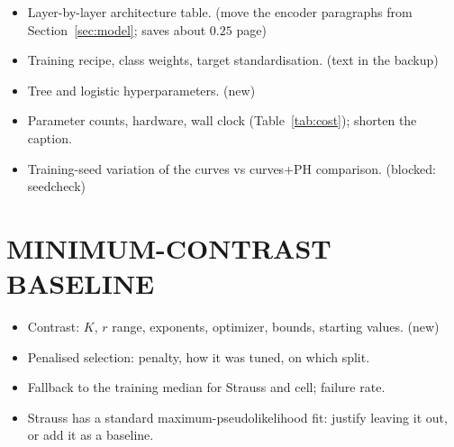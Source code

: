 \documentclass[twoside]{article}
\newcommand{\new}[1]{\textcolor{green!45!black}{#1}}   %
\begin{document}
\begin{itemize}
  \item Layer-by-layer architecture table. (move the encoder paragraphs from Section~\ref{sec:model}; saves about $0.25$ page)
  \item Training recipe, class weights, target standardisation. (text in the backup)
  \item Tree and logistic hyperparameters. (new)
  \item Parameter counts, hardware, wall clock (Table~\ref{tab:cost}); shorten the caption.
  \item Training-seed variation of the curves vs curves+PH comparison. (blocked: seedcheck)
\end{itemize}

\begin{table}[h]
\caption{Each model's input representation and training cost. ``Classifier'' is wall-clock seconds to train the one
$8$-way classifier until early stopping; ``Estimators'' is the same summed over the seven per-family estimators.
``Input'' names the tensors the model sees: \emph{curves} is the $(4,512)$ summary-function stack, \emph{classical}
the same curves as a feature table for the tree learners, and each filtration name a persistence summary of that
filtration's diagrams. \new{All four network rows} share one trainer and stopping rule, so their differences are the
cost of the persistence images alone. Lower is cheaper; cost is not the point of the comparison.}
\label{tab:cost}
\begin{center}
\footnotesize

\end{center}
\end{table}

\section{MINIMUM-CONTRAST BASELINE}
\label{app:mincontrast}

\begin{itemize}
  \item Contrast: $K$, $r$ range, exponents, optimizer, bounds, starting values. (new)
  \item Penalised selection: penalty, how it was tuned, on which split.
  \item Fallback to the training median for Strauss and cell; failure rate.
  \item Strauss has a standard maximum-pseudolikelihood fit: justify leaving it out, or add it as a baseline.
\end{itemize}
\end{document}
